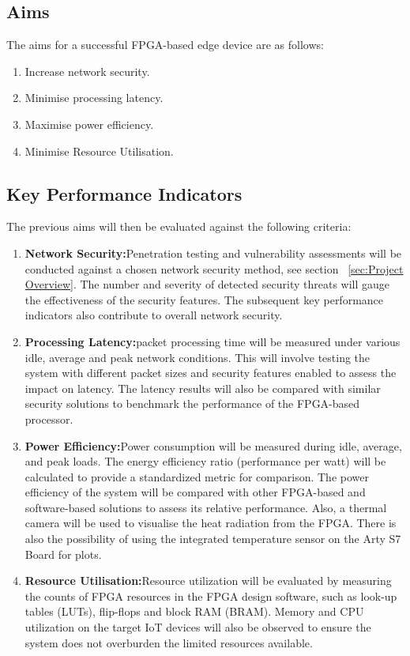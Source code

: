 \subsection{Aims}
The aims for a successful FPGA-based edge device are as follows:
\begin{enumerate}
    \item Increase network security.
    \item Minimise processing latency.
    \item Maximise power efficiency.
    \item Minimise Resource Utilisation.
\end{enumerate}

\subsection{Key Performance Indicators}
The previous aims will then be evaluated against the following criteria:
\begin{enumerate}
    \item\textbf{Network Security:}\newline Penetration testing and vulnerability assessments will be conducted against a chosen network security method, see section ~\ref{sec:Project Overview}. The number and severity of detected security threats will gauge the effectiveness of the security features. The subsequent key performance indicators also contribute to overall network security.
    \item\textbf{Processing Latency:}\newline packet processing time will be measured under various idle, average and peak network conditions. This will involve testing the system with different packet sizes and security features enabled to assess the impact on latency. The latency results will also be compared with similar security solutions to benchmark the performance of the FPGA-based processor.
    \item\textbf{Power Efficiency:}\newline Power consumption will be measured during idle, average, and peak loads. The energy efficiency ratio (performance per watt) will be calculated to provide a standardized metric for comparison. The power efficiency of the system will be compared with other FPGA-based and software-based solutions to assess its relative performance. Also, a thermal camera will be used to visualise the heat radiation from the FPGA. There is also the possibility of using the integrated temperature sensor on the Arty S7 Board \cite{ArtyS7RefManual} for plots.
    \item\textbf{Resource Utilisation:}\newline Resource utilization will be evaluated by measuring the counts of FPGA resources in the FPGA design software, such as look-up tables (LUTs), flip-flops and block RAM (BRAM). Memory and CPU utilization on the target IoT devices will also be observed to ensure the system does not overburden the limited resources available.
\end{enumerate}
\clearpage

